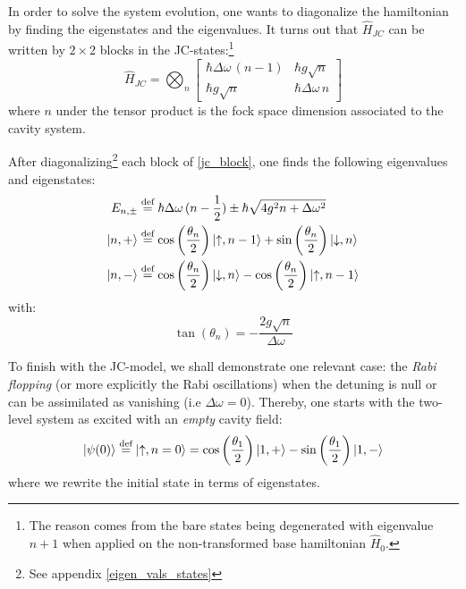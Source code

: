\documentclass[11pt]{report}
\DeclarePairedDelimiter\ket{\lvert}{\rangle}
\begin{document}
In order to solve the system evolution, one wants to diagonalize the hamiltonian by finding the eigenstates and the eigenvalues. It turns out that $\hat{H}_{JC}$ can be written by $2\times 2$ blocks in the JC-states:\footnote{The reason comes from the bare states being degenerated with eigenvalue $n+1$ when applied on the non-transformed base hamiltonian $\hat{H}_0$.}
\begin{equation}
\label{jc_block}
\hat{H}_{JC} = \bigotimes_n \begin{bmatrix}
\hbar \Delta\omega \, (n-1) & \hbar g \sqrt{n}\\
\hbar g \sqrt{n} & \hbar \Delta\omega \, n
\end{bmatrix}
\end{equation}
where $n$ under the tensor product is the fock space dimension associated to the cavity system.

After diagonalizing\footnote{See appendix \ref{eigen_vals_states}} each block of \eqref{jc_block}, one finds the following eigenvalues and eigenstates:
\begin{align}
\label{jc_eigens}
E_{n, \pm} &\stackrel{\text{def}}{=} \hbar\Delta\omega\,(n-\frac{1}{2}) \pm \hbar\sqrt{4g^2n + \Delta\omega ^2}\\
\ket{n, +} &\stackrel{\text{def}}{=} \cos\left(\frac{\theta_n}{2}\right) \ket{\uparrow, n - 1}  + \sin\left(\frac{\theta_n}{2}\right) \ket{\downarrow, n}\\
\ket{n, -} &\stackrel{\text{def}}{=} \cos\left(\frac{\theta_n}{2}\right) \ket{\downarrow, n}  - \cos\left(\frac{\theta_n}{2}\right) \ket{\uparrow, n - 1}
\end{align}
with:
\begin{equation}
\label{tan_theta_n}
\tan\left(\theta_n\right) = -\frac{2g\sqrt{n}}{\Delta\omega}
\end{equation}

To finish with the JC-model, we shall demonstrate one relevant case: the \textit{Rabi flopping} (or more explicitly the Rabi oscillations) when the detuning is null or can be assimilated as vanishing (i.e $\Delta\omega = 0$). Thereby, one starts with the two-level system as excited with an \textit{empty} cavity field:
\begin{equation}
\ket{\psi(0)} \stackrel{\text{def}}{=} \ket{\uparrow, n = 0} = \cos\left(\frac{\theta_{1}}{2}\right) \ket{1, +} - \sin\left(\frac{\theta_{1}}{2}\right) \ket{1, -}
\end{equation}
where we rewrite the initial state in terms of eigenstates.
\end{document}
